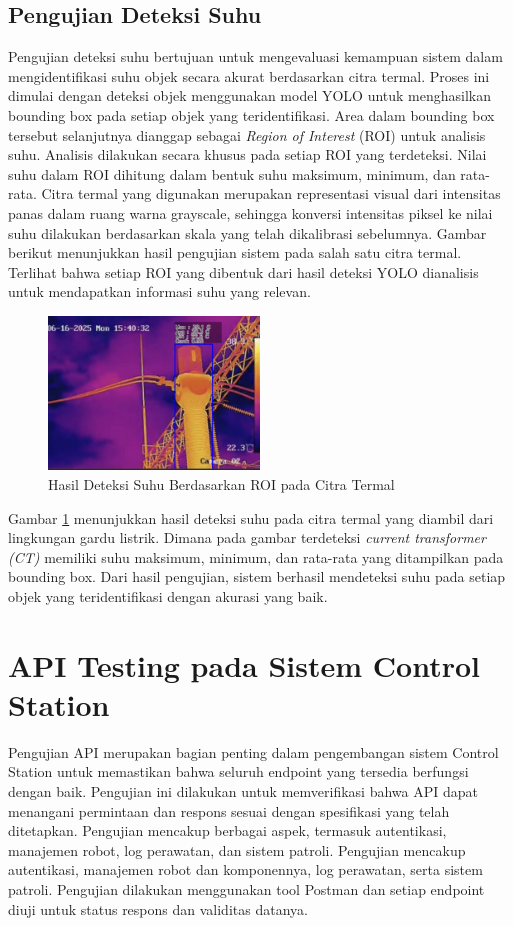 \subsection{Pengujian Deteksi Suhu}

Pengujian deteksi suhu bertujuan untuk mengevaluasi kemampuan sistem dalam mengidentifikasi suhu objek secara akurat berdasarkan citra termal. Proses ini dimulai dengan deteksi objek menggunakan model YOLO untuk menghasilkan bounding box pada setiap objek yang teridentifikasi. Area dalam bounding box tersebut selanjutnya dianggap sebagai \textit{Region of Interest} (ROI) untuk analisis suhu. Analisis dilakukan secara khusus pada setiap ROI yang terdeteksi. Nilai suhu dalam ROI dihitung dalam bentuk suhu maksimum, minimum, dan rata-rata. Citra termal yang digunakan merupakan representasi visual dari intensitas panas dalam ruang warna grayscale, sehingga konversi intensitas piksel ke nilai suhu dilakukan berdasarkan skala yang telah dikalibrasi sebelumnya. Gambar berikut menunjukkan hasil pengujian sistem pada salah satu citra termal. Terlihat bahwa setiap ROI yang dibentuk dari hasil deteksi YOLO dianalisis untuk mendapatkan informasi suhu yang relevan.

\begin{figure}[H]
\centering
\includegraphics[width=0.5\textwidth]{gambar/bab4/swq.png}
\caption{Hasil Deteksi Suhu Berdasarkan ROI pada Citra Termal}
\label{fig:deteksi_suhu}
\end{figure}

Gambar \ref{fig:deteksi_suhu} menunjukkan hasil deteksi suhu pada citra termal yang diambil dari lingkungan gardu listrik.  Dimana pada gambar terdeteksi \emph{current transformer (CT)} memiliki suhu maksimum, minimum, dan rata-rata yang ditampilkan pada bounding box. Dari hasil pengujian, sistem berhasil mendeteksi suhu pada setiap objek yang teridentifikasi dengan akurasi yang baik. 

\section{API Testing pada Sistem Control Station}
Pengujian API merupakan bagian penting dalam pengembangan sistem Control Station untuk memastikan bahwa seluruh endpoint yang tersedia berfungsi dengan baik. Pengujian ini dilakukan untuk memverifikasi bahwa API dapat menangani permintaan dan respons sesuai dengan spesifikasi yang telah ditetapkan. Pengujian mencakup berbagai aspek, termasuk autentikasi, manajemen robot, log perawatan, dan sistem patroli. Pengujian mencakup autentikasi, manajemen robot dan komponennya, log perawatan, serta sistem patroli. Pengujian dilakukan menggunakan tool Postman dan setiap endpoint diuji untuk status respons dan validitas datanya.

